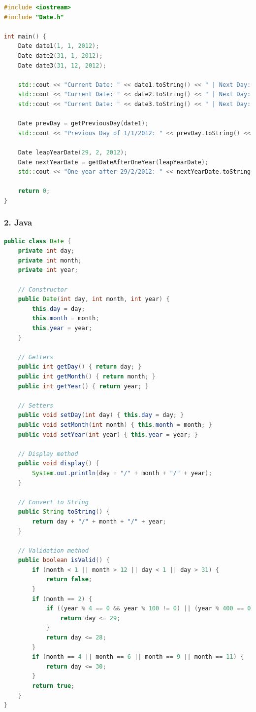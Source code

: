 \documentclass{article}
\begin{document}
\begin{lstlisting}[language=C++, caption=main.cpp]
#include <iostream>
#include "Date.h"

int main() {
    Date date1(1, 1, 2012);
    Date date2(31, 1, 2012);
    Date date3(31, 12, 2012);

    std::cout << "Current Date: " << date1.toString() << " | Next Day: " << getNextDay(date1).toString() << std::endl;
    std::cout << "Current Date: " << date2.toString() << " | Next Day: " << getNextDay(date2).toString() << std::endl;
    std::cout << "Current Date: " << date3.toString() << " | Next Day: " << getNextDay(date3).toString() << std::endl;

    Date prevDay = getPreviousDay(date1);
    std::cout << "Previous Day of 1/1/2012: " << prevDay.toString() << std::endl;

    Date leapYearDate(29, 2, 2012);
    Date nextYearDate = getDateAfterOneYear(leapYearDate);
    std::cout << "One year after 29/2/2012: " << nextYearDate.toString() << std::endl;

    return 0;
}
\end{lstlisting}

\subsubsection*{2. Java}

\begin{lstlisting}[language=Java, caption=Date.java]
public class Date {
    private int day;
    private int month;
    private int year;

    // Constructor
    public Date(int day, int month, int year) {
        this.day = day;
        this.month = month;
        this.year = year;
    }

    // Getters
    public int getDay() { return day; }
    public int getMonth() { return month; }
    public int getYear() { return year; }

    // Setters
    public void setDay(int day) { this.day = day; }
    public void setMonth(int month) { this.month = month; }
    public void setYear(int year) { this.year = year; }

    // Display method
    public void display() {
        System.out.println(day + "/" + month + "/" + year);
    }

    // Convert to String
    public String toString() {
        return day + "/" + month + "/" + year;
    }

    // Validation method
    public boolean isValid() {
        if (month < 1 || month > 12 || day < 1 || day > 31) {
            return false;
        }
        if (month == 2) {
            if ((year % 4 == 0 && year % 100 != 0) || (year % 400 == 0)) {
                return day <= 29;
            }
            return day <= 28;
        }
        if (month == 4 || month == 6 || month == 9 || month == 11) {
            return day <= 30;
        }
        return true;
    }
}
\end{lstlisting}
\end{document}
